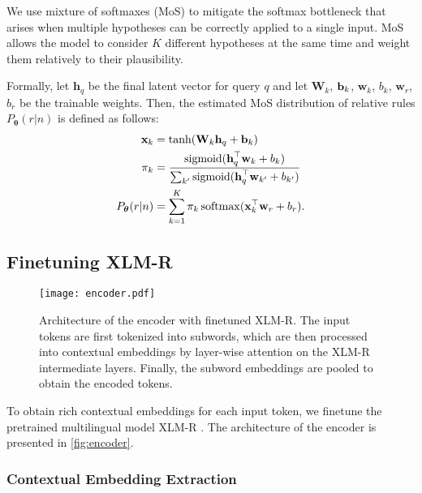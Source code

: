 \documentclass[11pt,a4paper]{article}
\begin{document}
We use mixture of softmaxes (MoS) to mitigate the softmax bottleneck \cite{yang2017breaking} that arises when multiple hypotheses can be correctly applied to a single input. MoS allows the model to consider $K$ different hypotheses at the same time and weight them relatively to their plausibility.


Formally, let $\textbf{h}_q$ be the final latent vector for query $q$ and let $\textbf{W}_k$, $\textbf b_k$, $\textbf{w}_k$, $b_k$, $\textbf{w}_r$, $b_r$ be the trainable weights. Then, the estimated MoS distribution of relative rules $P_{\bm{\theta}}(r | n)$ is defined as follows:\begin{align*}
    \textbf{x}_k &= \tanh(\textbf{W}_k\textbf{h}_q + \textbf b_k) \\
    \pi_k &= \frac{\operatorname{sigmoid}(\textbf{h}_q^\top \textbf{w}_k + b_k)}{\sum_{k'}{\operatorname{sigmoid}(\textbf{h}_q^\top \textbf{w}_{k'} + b_{k'})}} \\
    P_{\bm{\theta}}(r \vert n) &= \sum_{k=1}^{K}{\pi_k \operatorname{softmax}(\textbf{x}_k^\top \textbf{w}_r + b_r)}.
\end{align*} \subsection{Finetuning XLM-R}
\label{section:xlm}

\begin{figure}
\texttt{[image: encoder.pdf]}
\caption{Architecture of the encoder with finetuned XLM-R. The input tokens are first tokenized into subwords, which are then processed into contextual embeddings by layer-wise attention on the XLM-R intermediate layers. Finally, the subword embeddings are pooled to obtain the encoded tokens.}
\label{fig:encoder}
\end{figure}

To obtain rich contextual embeddings for each input token, we finetune the pretrained multilingual model XLM-R \cite{conneau2019unsupervised}.
The architecture of the encoder is presented in \autoref{fig:encoder}.

\subsubsection{Contextual Embedding Extraction}
\label{section:contextual_embedding_extraction}
\end{document}

